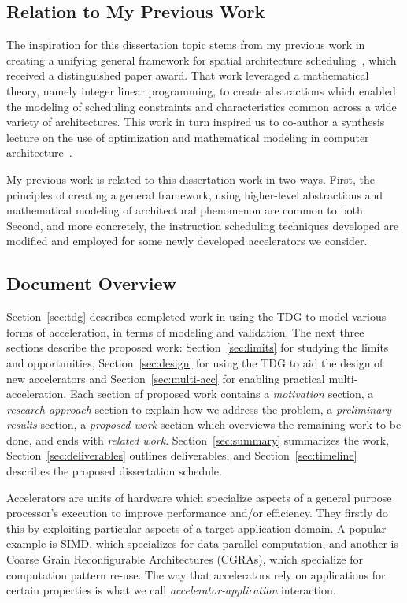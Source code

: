 \subsection{Relation to My Previous Work}

The inspiration for this dissertation topic stems from my previous work in creating
a unifying general framework for spatial architecture scheduling~\cite{ILP_Sched},
which received a distinguished paper award.
That work leveraged a mathematical theory, namely integer linear programming,
to create abstractions which enabled the modeling of scheduling 
constraints and characteristics common across a wide variety of architectures.
This work in turn inspired us to co-author a synthesis lecture on the use of
optimization and mathematical modeling in 
computer architecture~\cite{DBLP:series/synthesis/2013Sankaralingam}.

My previous work is related to this dissertation work in two ways.  First, the
principles of creating a general framework, using higher-level abstractions and
mathematical modeling of architectural phenomenon are common to both.  Second,
and more concretely, the instruction scheduling techniques developed are
modified and employed for some newly developed accelerators we consider.

\subsection{Document Overview}

Section~\ref{sec:tdg} describes completed work in using the TDG to model various forms of
acceleration, in terms of modeling and validation.  The next three sections
describe the proposed work: Section~\ref{sec:limits} for studying the limits
and opportunities, Section~\ref{sec:design} for using the TDG to aid the design
of new accelerators and Section~\ref{sec:multi-acc} for enabling practical
multi-acceleration.  Each section of proposed work contains a \emph{motivation}
section, a \emph{research approach} section to explain how we address the problem,
a \emph{preliminary results} section, a \emph{proposed work} section 
which overviews the remaining work to be done, and ends with \emph{related work}.
Section~\ref{sec:summary} summarizes the work, 
Section~\ref{sec:deliverables} outlines deliverables,
and Section~\ref{sec:timeline} describes the proposed dissertation schedule.


Accelerators are units of hardware which specialize aspects of a general 
purpose processor's execution to improve performance and/or efficiency.  
They firstly do this by exploiting particular aspects of a target application domain.
A popular example is SIMD, which specializes for data-parallel computation, and
another is Coarse Grain Reconfigurable Architectures (CGRAs),
 which specialize for computation pattern re-use.  The way that accelerators
rely on applications for certain properties is what we call \emph{accelerator-application}
interaction.

